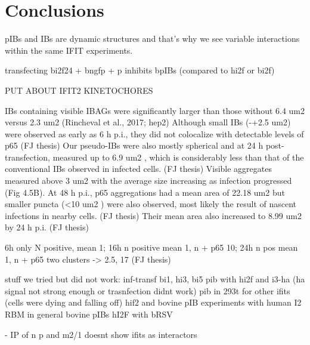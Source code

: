 \section{Conclusions} \label{sec:Conclusions-Chapter4}
pIBs and IBs are dynamic structures and that's why we see variable interactions within the same IFIT experiments.

transfecting bi2f24 + bngfp + p inhibits bpIBs (compared to hi2f or bi2f)



PUT ABOUT IFIT2 KINETOCHORES

IBs containing visible IBAGs were significantly larger than those without 6.4 um2 versus 2.3 um2 (Rincheval et al., 2017; hep2)
Although small IBs (-+2.5 um2) were observed as early as 6 h p.i., they did not colocalize with detectable levels of p65 (FJ thesis)
Our pseudo-IBs were also mostly spherical and at 24 h post-transfection, measured up to 6.9 um2 , which is considerably less than that of the conventional IBs observed in infected cells. (FJ thesis)
Visible aggregates measured above 3 um2 with the average size increasing as infection progressed (Fig 4.5B). At 48 h p.i., p65 aggregations had a mean area of 22.18 um2 but smaller puncta (<10 um2 ) were also observed, most likely the result of nascent infections in nearby cells. (FJ thesis)
Their mean area also increased to 8.99 um2 by 24 h p.i. (FJ thesis)

6h only N positive, mean 1; 16h n positive mean 1, n + p65 10; 24h n pos mean 1, n + p65 two clusters -> 2.5, 17 (FJ thesis)

stuff we tried but did not work: 
inf-transf bi1, hi3, bi5
pib with hi2f and i3-ha (ha signal not strong enough or trasnfection didnt work)
pib in 293t for other ifits (cells were dying and falling off)
hif2 and bovine pIB
experiments with human I2 RBM
in general bovine pIBs
hI2F with bRSV



\cite{Oliveira2013HumanCells} - IP of n p and m2/1 doesnt show ifits as interactors 

